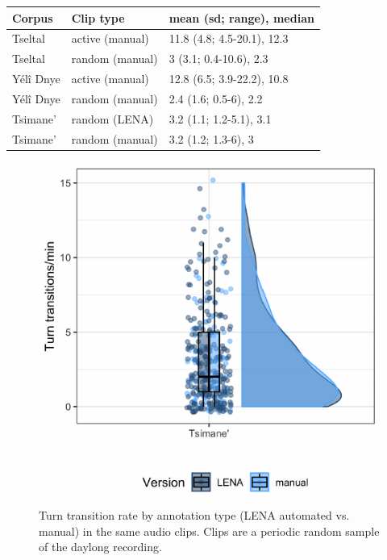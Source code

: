 \documentclass[10pt, letterpaper]{article}
\newenvironment{CodeChunk}{}{}
\begin{document}
\begin{table}[h]
\centering
\begin{tabular}{lll}
  \hline
Corpus & Clip type & mean (sd; range), median \\ 
  \hline
Tseltal & active (manual) & 11.8 (4.8; 4.5-20.1), 12.3 \\ 
  Tseltal & random (manual) & 3 (3.1; 0.4-10.6), 2.3 \\ 
  Yélî Dnye & active (manual) & 12.8 (6.5; 3.9-22.2), 10.8 \\ 
  Yélî Dnye & random (manual) & 2.4 (1.6; 0.5-6), 2.2 \\ 
  Tsimane' & random (LENA) & 3.2 (1.1; 1.2-5.1), 3.1 \\ 
  Tsimane' & random (manual) & 3.2 (1.2; 1.3-6), 3 \\ 
   \hline
\end{tabular}
\end{table}

\begin{CodeChunk}
\begin{figure}[h]

{\centering \includegraphics{figs/tsi.ttr.fig-1} 

}

\caption[Turn transition rate by annotation type (LENA automated vs]{Turn transition rate by annotation type (LENA automated vs. manual) in the same audio clips. Clips are a periodic random sample of the daylong recording.}\label{fig:tsi.ttr.fig}
\end{figure}
\end{CodeChunk}
\end{document}
